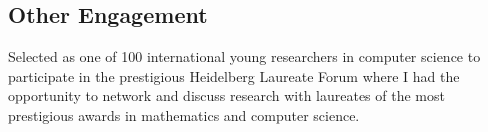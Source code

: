 \documentclass[a4paper,12pt]{article}
\begin{document}
\subsection{Other Engagement}
\begin{expblock}
    Selected as one of 100 international young researchers in computer science to participate in the prestigious Heidelberg Laureate Forum where I had the opportunity to network and discuss research with laureates of the most prestigious awards in mathematics and computer science.%
\end{expblock}


\end{document}
